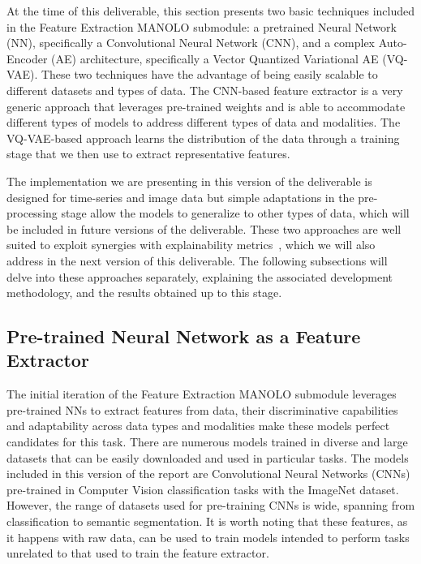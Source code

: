 At the time of this deliverable, this section presents two basic techniques included in the Feature Extraction MANOLO submodule: a pretrained Neural Network (NN), specifically a Convolutional Neural Network (CNN),  and a complex Auto-Encoder (AE) architecture, specifically a Vector Quantized Variational AE (VQ-VAE). These two techniques have the advantage of being easily scalable to different datasets and types of data. The CNN-based feature extractor is a very generic approach that leverages pre-trained weights and is able to accommodate different types of models to address different types of data and modalities. The VQ-VAE-based approach learns the distribution of the data through a training stage that we then use to extract representative features. 

The implementation we are presenting in this version of the deliverable is designed for time-series and image data but simple adaptations in the pre-processing stage allow the models to generalize to other types of data, which will be included in future versions of the deliverable. These two approaches are well suited to exploit synergies with explainability metrics~\cite{2022_ssrn_explain, 2024_Neurocomputing_explain}, which we will also address in the next version of this deliverable. The following subsections will delve into these approaches separately, explaining the associated development methodology, and the results obtained up to this stage.


\subsection{Pre-trained Neural Network as a Feature Extractor}
\label{subsec:2.3_featext_tech1}
The initial iteration of the Feature Extraction MANOLO submodule leverages pre-trained NNs to extract features from data, their discriminative capabilities and adaptability across data types and modalities make these models perfect candidates for this task. There are numerous models trained in diverse and large datasets that can be easily downloaded and used in particular tasks. The models included in this version of the report are Convolutional Neural Networks (CNNs) pre-trained in Computer Vision classification tasks with the ImageNet dataset. However, the range of datasets used for pre-training CNNs is wide, spanning from classification to semantic segmentation. It is worth noting that these features, as it happens with raw data, can be used to train models intended to perform tasks unrelated to that used to train the feature extractor.

